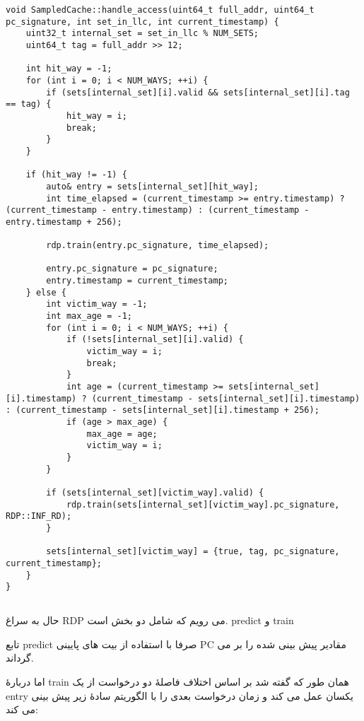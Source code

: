 \documentclass[17pt]{article}
\begin{document}
\begin{LTR}
\begin{lstlisting}
void SampledCache::handle_access(uint64_t full_addr, uint64_t pc_signature, int set_in_llc, int current_timestamp) {
    uint32_t internal_set = set_in_llc % NUM_SETS;
    uint64_t tag = full_addr >> 12;

    int hit_way = -1;
    for (int i = 0; i < NUM_WAYS; ++i) {
        if (sets[internal_set][i].valid && sets[internal_set][i].tag == tag) {
            hit_way = i;
            break;
        }
    }

    if (hit_way != -1) {
        auto& entry = sets[internal_set][hit_way];
        int time_elapsed = (current_timestamp >= entry.timestamp) ? (current_timestamp - entry.timestamp) : (current_timestamp - entry.timestamp + 256);
        
        rdp.train(entry.pc_signature, time_elapsed);

        entry.pc_signature = pc_signature;
        entry.timestamp = current_timestamp;
    } else {
        int victim_way = -1;
        int max_age = -1;
        for (int i = 0; i < NUM_WAYS; ++i) {
            if (!sets[internal_set][i].valid) {
                victim_way = i;
                break;
            }
            int age = (current_timestamp >= sets[internal_set][i].timestamp) ? (current_timestamp - sets[internal_set][i].timestamp) : (current_timestamp - sets[internal_set][i].timestamp + 256);
            if (age > max_age) {
                max_age = age;
                victim_way = i;
            }
        }
        
        if (sets[internal_set][victim_way].valid) {
            rdp.train(sets[internal_set][victim_way].pc_signature, RDP::INF_RD);
        }

        sets[internal_set][victim_way] = {true, tag, pc_signature, current_timestamp};
    }
}
\end{lstlisting}
\end{LTR}

\subsection{}
حال به سراغ RDP می رویم که شامل دو بخش است. predict و train

تابع predict صرفا با استفاده از بیت های پایینی PC مقادیر پیش بینی شده را بر می گرداند.

اما دربارهٔ train همان طور که گفته شد بر اساس اختلاف فاصلهٔ دو درخواست از یک entry یکسان عمل می کند و زمان درخواست بعدی را با الگوریتم سادهٔ زیر پیش بینی می کند:
\end{document}
